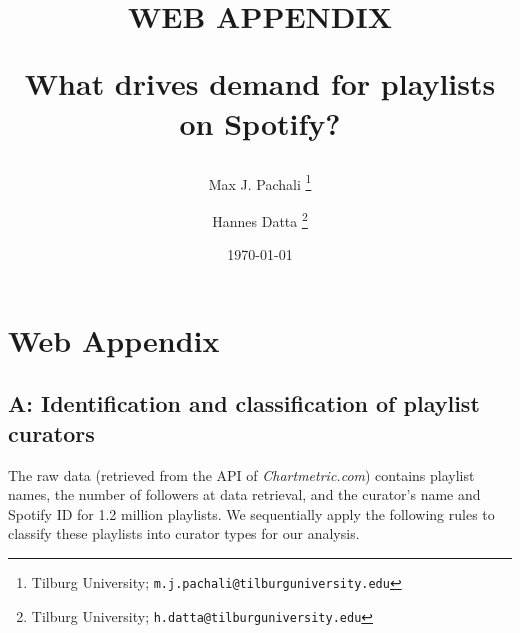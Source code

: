 \documentclass[12pt, a4paper, leqno]{article}
\begin{document}
\begin{titlepage}
\title{
%
%
WEB APPENDIX

What drives demand for playlists on Spotify? 
}

\author{
Max J. Pachali
\thanks{Tilburg University; \texttt{m.j.pachali@tilburguniversity.edu}}
\and 
Hannes Datta
\thanks{Tilburg University; \texttt{h.datta@tilburguniversity.edu}}}
\date{\today}
\maketitle

\newpage
\setcounter{page}{2}

\end{titlepage}
\newpage


\setcounter{page}{2}

%


\section*{Web Appendix}




\setcounter{figure}{0}

\setcounter{table}{0}

\setcounter{footnote}{0}


\renewcommand\thefigure{W\arabic{figure}}
\renewcommand\thetable{W\arabic{table}}


\subsection*{A: Identification and classification of playlist curators}
\label{curators}


The raw data (retrieved from the API of \textit{Chartmetric.com}) contains playlist names, the number of followers at data retrieval, and the curator's name and Spotify ID for 1.2 million playlists. We sequentially apply the following rules to classify these playlists into curator types for our analysis.
\end{document}
